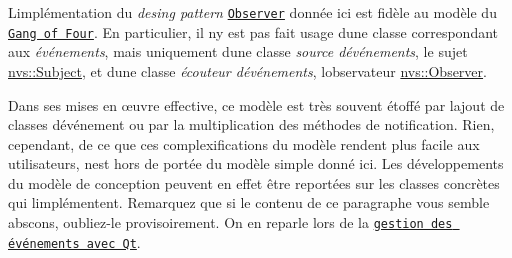L\textquotesingle{}implémentation du {\itshape desing pattern} \href{https://en.wikipedia.org/wiki/Observer_pattern}{\tt Observer} donnée ici est fidèle au modèle du \href{https://en.wikipedia.org/wiki/Design_Patterns}{\tt Gang of Four}. En particulier, il n\textquotesingle{}y est pas fait usage d\textquotesingle{}une classe correspondant aux {\itshape événements}, mais uniquement d\textquotesingle{}une classe {\itshape source d\textquotesingle{}événements}, le sujet \mbox{\hyperlink{classnvs_1_1_subject}{nvs\+::\+Subject}}, et d\textquotesingle{}une classe {\itshape écouteur d\textquotesingle{}événements}, l\textquotesingle{}observateur \mbox{\hyperlink{classnvs_1_1_observer}{nvs\+::\+Observer}}.

Dans ses mises en œuvre effective, ce modèle est très souvent étoffé par l\textquotesingle{}ajout de classes d\textquotesingle{}événement ou par la multiplication des méthodes de notification. Rien, cependant, de ce que ces complexifications du modèle rendent plus facile aux utilisateurs, n\textquotesingle{}est hors de portée du modèle simple donné ici. Les développements du modèle de conception peuvent en effet être reportées sur les classes concrètes qui l\textquotesingle{}implémentent. Remarquez que si le contenu de ce paragraphe vous semble abscons, oubliez-\/le provisoirement. On en reparle lors de la \href{https://doc.qt.io/qt-5/eventsandfilters.html}{\tt gestion des événements avec Qt}. 